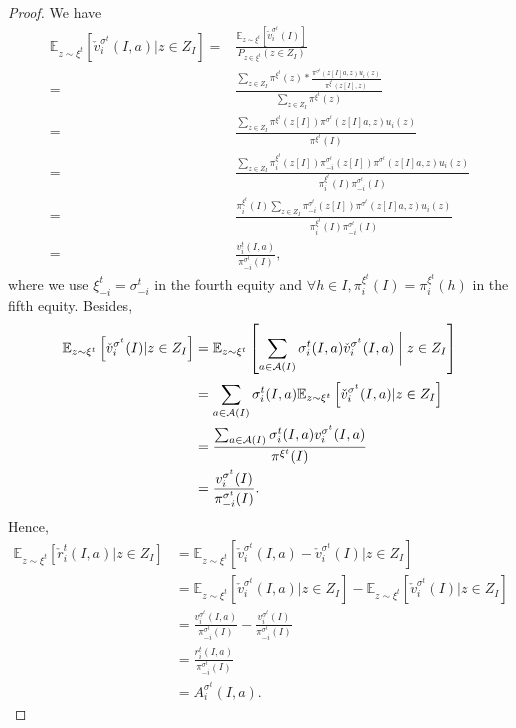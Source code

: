 \documentclass[letterpaper]{article} %
\makeatletter
\renewenvironment{align*}{%
  \linenomath 
  \start@align\@ne\st@rredtrue\m@ne
}{%
  \endalign
  \endlinenomath 
}
\makeatother
\begin{document}
\begin{proof}
    We have
    \begin{align*}
        \mathbb{E}_{z \sim \xi^t}\left[ \check{v}_i^{\sigma^t}(I, a) \vert z \in Z_I\right] =& \frac{\mathbb{E}_{z \sim \xi^t}\left[\check{v}_i^{\sigma^t}(I)\right]}{P_{z \in \xi^t}(z \in Z_I)} \\
        =& \frac{\sum_{z \in Z_I}^{}\pi^{\xi^t}(z) * \frac{\pi^{\sigma^t}(z[I]a, z)u_i(z)}{\pi^{\xi^t}(z[I], z)}}{\sum_{z \in Z_I}^{}\pi^{\xi^t}(z)} \\
        =& \frac{\sum_{z \in Z_I}^{}\pi^{\xi^t}(z[I])\pi^{\sigma^t}(z[I]a, z)u_i(z)}{\pi^{\xi^t}(I)} \\
        =& \frac{\sum_{z \in Z_I}^{}\pi_i^{\xi^t}(z[I])\pi_{-i}^{\sigma^t}(z[I])\pi^{\sigma^t}(z[I]a, z)u_i(z)}{\pi_i^{\xi^t}(I)\pi_{-i}^{\sigma^t}(I)} \\
        =& \frac{\pi_i^{\xi^t}(I)\sum_{z \in Z_I}^{}\pi_{-i}^{\sigma^t}(z[I])\pi^{\sigma^t}(z[I]a, z)u_i(z)}{\pi_i^{\xi^t}(I)\pi_{-i}^{\sigma^t}(I)} \\
        =& \frac{v_i^t(I, a)}{\pi_{-i}^{\sigma^t}(I)},
    \end{align*}
    where we use $\xi^t_{-i} = \sigma_{-i}^t$ in the fourth equity and $\forall h \in I, \pi_i^{\xi^t}(I) = \pi_i^{\xi^t}(h)$ in the fifth equity. Besides, 
    \begin{align*}
        \mathbb{E}_{z \sim \xi^t}\left[ \check{v}_i^{\sigma^t}(I) \vert z \in Z_I\right]  &= \mathbb{E}_{z \sim \xi^t}\left[ \sum_{a \in \mathcal{A}(I)}^{}\sigma^t_i(I, a)\check{v}_i^{\sigma^t}(I, a) \biggm| z \in Z_I\right] \\
        &= \sum_{a \in \mathcal{A}(I)}^{}\sigma_i^t(I, a)\mathbb{E}_{z \sim \xi^t}\left[ \check{v}_i^{\sigma^t}(I, a) \vert z \in Z_I\right] \\
        &= \frac{\sum_{a \in \mathcal{A}(I)}^{}\sigma_i^t(I, a)v_i^{\sigma^t}(I, a)}{\pi^{\xi^t}(I)} \\
        &= \frac{v_i^{\sigma^t}(I)}{\pi_{-i}^{\sigma^t}(I)}.
    \end{align*}
    Hence,
    \begin{align*}
        \mathbb{E}_{z \sim \xi^t}\left[ \check{r}_i^{t}(I, a) \vert z \in Z_I\right] &= \mathbb{E}_{z \sim \xi^t}\left[ \check{v}_i^{\sigma^t}(I, a) - \check{v}_i^{\sigma^t}(I)\vert z \in Z_I\right] \\
        &= \mathbb{E}_{z \sim \xi^t}\left[ \check{v}_i^{\sigma^t}(I, a) \vert z \in Z_I\right] - \mathbb{E}_{z \sim \xi^t}\left[ \check{v}_i^{\sigma^t}(I) \vert z \in Z_I\right] \\
        &= \frac{v_i^{\sigma^t}(I, a)}{\pi_{-i}^{\sigma^t}(I)} - \frac{v_i^{\sigma^t}(I)}{\pi_{-i}^{\sigma^t}(I)} \\
        &= \frac{r_i^t(I, a)}{\pi_{-i}^{\sigma^t}(I)} \\
        &= A_i^{\sigma^t}(I, a).
    \end{align*}    
\end{proof}
\end{document}
